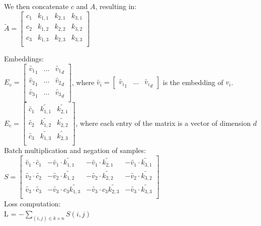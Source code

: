  We then concatenate $c$ and $A$, 
resulting in: \\
$\tilde{A} = \begin{bmatrix}
c_1 & k_{1,1} & k_{2,1} & k_{3,1}\\
c_2 & k_{1,2} & k_{2,2} & k_{3,2}\\
c_3 & k_{1,3} & k_{2,3}& k_{3,3}\\
\end{bmatrix}$

Embeddings:\\
$E_v = \begin{bmatrix}
\tilde{v_1}_1 & \ldots & \tilde{v_1}_d\\
\tilde{v_2}_1 & \ldots & \tilde{v_2}_d\\
\tilde{v_3}_1 & \ldots & \tilde{v_3}_d\\
\end{bmatrix}
$, where $\tilde{v_i} = \begin{bmatrix}
\tilde{v_i}_1 & \ldots & \tilde{v_i}_d \end{bmatrix}$ is the embedding of $v_i$.  \\$E_c = \begin{bmatrix}
\tilde{c_1 }& \tilde{k_{1,1}} & \tilde{k_{2,1}} \\
\tilde{c_2 }& \tilde{k_{1,2}}& \tilde{k_{2,2}} \\
\tilde{c_3 }&\tilde{ k_{1,3} }& \tilde{k_{2,3}}\\
\end{bmatrix}$,
where each entry of the matrix is a vector of dimension $d$\\

Batch multiplication and negation of samples:\\
$S = \begin{bmatrix}
\tilde{v_1} \cdot  \tilde{c_1} & -\tilde{v_1} \cdot \tilde{k_{1,1}} & -\tilde{v_1} \cdot  \tilde{k_{2,1}}& -\tilde{v_1} \cdot  \tilde{k_{3,1}}\\
\tilde{v_2} \cdot \tilde{c_2} & -\tilde{v_2} \cdot \tilde{k_{1,2}} & -\tilde{v_2} \cdot \tilde{k_{2,2}} & -\tilde{v_2} \cdot \tilde{k_{3,2}}\\
\tilde{v_3} \cdot \tilde{c_3} &-\tilde{v_3} \cdot c_3  \tilde{k_{1,3}} & -\tilde{v_3} \cdot c_3 \tilde{k_{2,3}}&-\tilde{v_3} \cdot \tilde{k_{3,3}}\\
\end{bmatrix}$\\

Loss computation: \\
 L = $- \sum_{(i,j) \in k \times n} S(i,j) $
 
